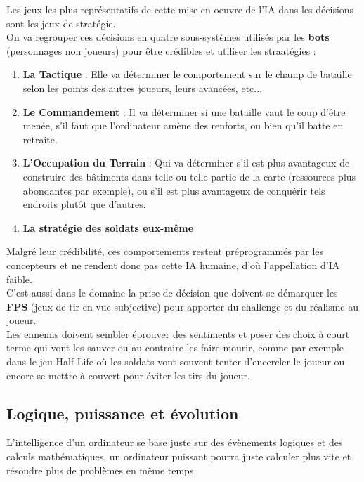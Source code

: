 \documentclass[a4paper,10pt,final,fleqn]{article}
\begin{document}
		Les jeux les plus représentatifs de cette mise en oeuvre de l'IA dans les décisions sont les jeux de stratégie.\\
		On va regrouper ces décisions en quatre sous-systèmes utilisés par les \textbf{bots} (personnages non joueurs) pour être crédibles et utiliser les straatégies : \\

		\begin{enumerate}
			\item \textbf{La Tactique} : Elle va déterminer le comportement sur le champ de bataille selon les points des autres joueurs, leurs avancées, etc...
			\item \textbf{Le Commandement} : Il va déterminer si une bataille vaut le coup d'être menée, s'il faut que l'ordinateur amène des renforts, ou bien qu'il batte en retraite.\\
			\item \textbf{L'Occupation du Terrain} : Qui va déterminer s'il est plus avantageux de construire des bâtiments dans telle ou telle partie de la carte (ressources plus abondantes par exemple), ou s'il est plus avantageux de conquérir tels endroits plutôt que d'autres.\\
			\item \textbf{La stratégie des soldats eux-même}
		\end{enumerate}

		Malgré leur crédibilité, ces comportements restent préprogrammés par les concepteurs et ne rendent donc pas cette IA humaine, d'où l'appellation d'IA faible.\\

		C'est aussi dans le domaine la prise de décision que doivent se démarquer les \textbf{FPS} (jeux de tir en vue subjective) pour apporter du challenge et du réalisme au joueur.\\
		Les ennemis doivent sembler éprouver des sentiments et poser des choix à court terme qui vont les sauver ou au contraire les faire mourir, comme par exemple dans le jeu Half-Life où les soldats vont souvent tenter d'encercler le joueur ou encore se mettre à couvert pour éviter les tirs du joueur.\\

	\subsection{Logique, puissance et évolution}

		L'intelligence d'un ordinateur se base juste sur des évènements logiques et des calculs mathématiques, un ordinateur puissant pourra juste calculer plus vite et résoudre plus de problèmes en même temps.\\
\end{document}
